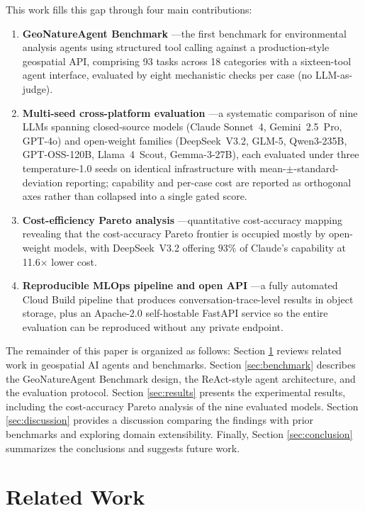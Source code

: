 \documentclass[sigconf]{acmart}
\begin{document}
This work fills this gap through four main contributions:
\begin{enumerate}
    \item \textbf{GeoNatureAgent Benchmark} ---the first benchmark for environmental analysis agents using structured tool calling against a production-style geospatial API, comprising 93 tasks across 18 categories with a sixteen-tool agent interface, evaluated by eight mechanistic checks per case (no LLM-as-judge).
    \item \textbf{Multi-seed cross-platform evaluation} ---a systematic comparison of nine LLMs spanning closed-source models (Claude Sonnet~4, Gemini~2.5~Pro, GPT-4o) and open-weight families (DeepSeek~V3.2, GLM-5, Qwen3-235B, GPT-OSS-120B, Llama~4~Scout, Gemma-3-27B), each evaluated under three tempe\-rature-1.0 seeds on identical infrastructure with mean-$\pm$-standard-deviation reporting; capability and per-case cost are reported as orthogonal axes rather than collapsed into a single gated score.
    \item \textbf{Cost-efficiency Pareto analysis} ---quantitative cost-accuracy mapping revealing that the cost-accuracy Pareto frontier is occupied mostly by open-weight models, with DeepSeek~V3.2 offering $93\%$ of Claude's capability at 11.6$\times$ lower cost.
    \item \textbf{Reproducible MLOps pipeline and open API} ---a fully automated Cloud Build pipeline that produces conversation-trace-level results in object storage, plus an Apache-2.0 self-hostable FastAPI service so the entire evaluation can be reproduced without any private endpoint.
\end{enumerate}

The remainder of this paper is organized as follows: Section \ref{sec:related} reviews related work in geospatial AI agents and benchmarks. Section \ref{sec:benchmark} describes the GeoNatureAgent Benchmark design, the ReAct-style agent architecture, and the evaluation protocol. Section \ref{sec:results} presents the experimental results, including the cost-accuracy Pareto analysis of the nine evaluated models. Section \ref{sec:discussion} provides a discussion comparing the findings with prior benchmarks and exploring domain extensibility. Finally, Section \ref{sec:conclusion} summarizes the conclusions and suggests future work.



\section{Related Work}
\label{sec:related}
\end{document}
